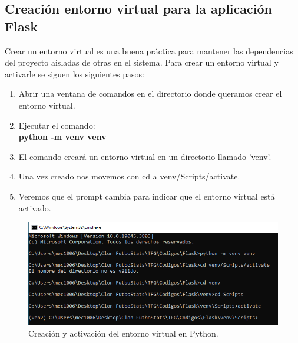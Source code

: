 \subsection{Creación entorno virtual para la aplicación Flask}
Crear un entorno virtual es una buena práctica para mantener las dependencias del proyecto aisladas de otras en el sistema. Para crear un entorno virtual y activarle se siguen los siguientes pasos:
\begin{enumerate}
    \item Abrir una ventana de comandos en el directorio donde queramos crear el entorno virtual.
    \item Ejecutar el comando: \\
    \textbf{python -m venv venv}
    \item El comando creará un entorno virtual en un directorio llamado 'venv'.
    \item Una vez creado nos movemos con cd a venv/Scripts/activate.
    \item Veremos que el prompt cambia para indicar que el entorno virtual está activado.
\end{enumerate}
\begin{figure}[H]
    \centering
    \includegraphics[width=0.75\linewidth]{img/entornoVirtual.png}
    \caption{Creación y activación del entorno virtual en Python.}
    \label{fig:enter-label}
\end{figure}


